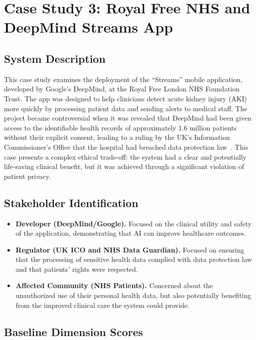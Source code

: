 \section{Case Study 3: Royal Free NHS and DeepMind Streams App}
\label{sec:cs3}

\subsection{System Description}

This case study examines the deployment of the \enquote{Streams} mobile application, developed by Google's DeepMind, at the Royal Free London NHS Foundation Trust. The app was designed to help clinicians detect acute kidney injury (AKI) more quickly by processing patient data and sending alerts to medical staff. The project became controversial when it was revealed that DeepMind had been given access to the identifiable health records of approximately 1.6 million patients without their explicit consent, leading to a ruling by the UK's Information Commissioner's Office that the hospital had breached data protection law~\cite{ico2017deepmind}. This case presents a complex ethical trade-off: the system had a clear and potentially life-saving clinical benefit, but it was achieved through a significant violation of patient privacy.

\subsection{Stakeholder Identification}

\begin{itemize}[leftmargin=2em]
  \item \textbf{Developer (DeepMind/Google).} Focused on the clinical utility and safety of the application, demonstrating that AI can improve healthcare outcomes.
  \item \textbf{Regulator (UK ICO and NHS Data Guardian).} Focused on ensuring that the processing of sensitive health data complied with data protection law and that patients' rights were respected.
  \item \textbf{Affected Community (NHS Patients).} Concerned about the unauthorized use of their personal health data, but also potentially benefiting from the improved clinical care the system could provide.
\end{itemize}

\subsection{Baseline Dimension Scores}

